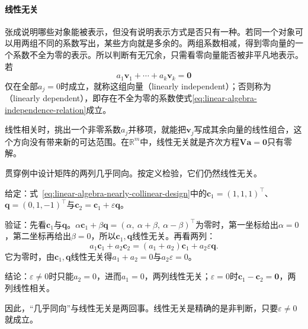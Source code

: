 \paragraph{线性无关}
\label{sec:ls-linear-dependence}
张成说明哪些对象能被表示，但没有说明表示方式是否只有一种。若同一个对象可以用两组不同的系数写出，某些方向就是多余的。两组系数相减，得到零向量的一个系数不全为零的表示。所以判断有无冗余，只需看零向量能否被非平凡地表示。若
\begin{equation}
 a_1\bm v_1+\cdots+a_k\bm v_k=\bm0
 \label{eq:linear-algebra-independence-relation}
\end{equation}
仅在全部$a_j=0$时成立，就称这组向量（linearly independent）；否则称为（linearly dependent），即存在不全为零的系数使式\eqref{eq:linear-algebra-independence-relation}成立。

线性相关时，挑出一个非零系数$a_j$并移项，就能把$\bm v_j$写成其余向量的线性组合，这个方向没有带来新的可达范围。在$\mathbb R^m$中，线性无关就是齐次方程$\bm V\bm a=\bm0$只有零解。

贯穿例中设计矩阵的两列几乎同向。按定义检验，它们仍然线性无关。
\begin{example}[近共线的两列仍线性无关]
\label{ex:ls-nearly-collinear-independence}
给定：式~\eqref{eq:linear-algebra-nearly-collinear-design}中的$\bm c_1=(1,1,1)^\top$、$\bm q=(0,1,-1)^\top$与$\bm c_2=\bm c_1+\varepsilon\bm q$。

验证：先看$\bm c_1$与$\bm q$。$\alpha\bm c_1+\beta\bm q=(\alpha,\ \alpha+\beta,\ \alpha-\beta)^\top$为零时，第一坐标给出$\alpha=0$，第二坐标再给出$\beta=0$，所以$\bm c_1,\bm q$线性无关。再看两列：
\[
 a_1\bm c_1+a_2\bm c_2=(a_1+a_2)\bm c_1+a_2\varepsilon\bm q .
\]
它为零时，由$\bm c_1,\bm q$线性无关得$a_1+a_2=0$与$a_2\varepsilon=0$。

结论：$\varepsilon\neq0$时只能$a_2=0$，进而$a_1=0$，两列线性无关；$\varepsilon=0$时$\bm c_1-\bm c_2=\bm0$，两列线性相关。
\end{example}
因此，“几乎同向”与线性无关是两回事。线性无关是精确的是非判断，只要$\varepsilon\neq0$就成立。

